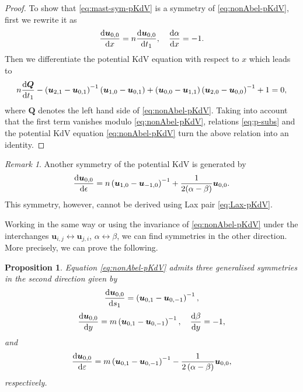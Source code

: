 \documentclass[dvips,10pt]{article}
\newcommand{\bs}{\boldsymbol}
\newcommand{\bsu}{ {\bs{u}}}
\newtheorem{proposition}{Proposition}
\theoremstyle{remark} %
\newtheorem{remark}{Remark}
\begin{document}
\begin{proof}
		To show that \eqref{eq:mast-sym-pKdV} is a symmetry of \eqref{eq:nonAbel-pKdV}, first we rewrite it as
		\begin{equation}\label{eq:mast-sym-pKdV-v2}
			\frac{{\rm{d}} {\bs{u}}_{0,0}}{{\rm{d}} x} =  n \frac{{\rm{d}} {\bs{u}}_{0,0}}{{\rm{d}} t_1}, ~~~ 	\frac{{\rm{d}} \alpha}{{\rm{d}} x} = -1.
		\end{equation}
		Then we differentiate the potential KdV equation with respect to $x$ which leads  to
		$$ n \frac{{\rm{d}} {\bs{Q}}}{{\rm{d}} t_1} - \left(\bsu_{2,1}- \bsu_{0,1}\right)^{-1} \left(\bsu_{1,0}- \bsu_{0,1}\right) + \left(\bsu_{0,0}- \bsu_{1,1}\right) \left(\bsu_{2,0}- \bsu_{0,0}\right)^{-1} +1 = 0, $$
		where ${\bs{Q}}$ denotes the left hand side of \eqref{eq:nonAbel-pKdV}. Taking into account that the first term vanishes modulo \eqref{eq:nonAbel-pKdV}, relations \eqref{eq:p-subs} and the potential KdV equation \eqref{eq:nonAbel-pKdV} turn the above relation into an identity.
	\end{proof}
	
	\begin{remark}
		Another symmetry of the potential KdV is generated by
		\begin{equation} \label{eq:sym1a-pKdV}
			\frac{{\rm{d}} {\bs{u}}_{0,0}}{{\rm{d}} \epsilon} =  n \left({\bs{u}}_{1,0}- {\bs{u}}_{-1,0}\right)^{-1} + \frac{1}{2(\alpha-\beta)} \bsu_{0,0}.
		\end{equation}
		This symmetry, however, cannot be derived using Lax pair \eqref{eq:Lax-pKdV}.
	\end{remark}
	
	
	Working in the same way or using the invariance of \eqref{eq:nonAbel-pKdV} under the interchanges $\bsu_{i,j} \leftrightarrow \bsu_{j,i}$, $\alpha \leftrightarrow \beta$, we can find symmetries in the other direction. More precisely, we can prove the following.
	\begin{proposition}
		Equation \eqref{eq:nonAbel-pKdV} admits three generalised symmetries in the second direction given by 
		\begin{equation} \label{eq:sym2-pKdV}
			\frac{{\rm{d}} {\bs{u}}_{0,0}}{{\rm{d}} s_1} =  \left({\bs{u}}_{0,1} -{\bs{u}}_{0,-1}\right)^{-1},
		\end{equation}
		\begin{equation} \label{eq:mast-sym-2-pKdV}
			\frac{{\rm{d}} {\bs{u}}_{0,0}}{{\rm{d}} y} =  m \left({\bs{u}}_{0,1} -{\bs{u}}_{0,-1}\right)^{-1},~~~ \frac{{\rm{d}} \beta}{{\rm{d}} y} = -1,
		\end{equation}
		and
		\begin{equation} \label{eq:sym2a-pKdV}
			\frac{{\rm{d}} {\bs{u}}_{0,0}}{{\rm{d}} \varepsilon} =  m \left({\bs{u}}_{0,1} -{\bs{u}}_{0,-1}\right)^{-1} - \frac{1}{2 \left(\alpha-\beta\right)} \bsu_{0,0},
		\end{equation}
		respectively.
	\end{proposition}
	
\end{document}
